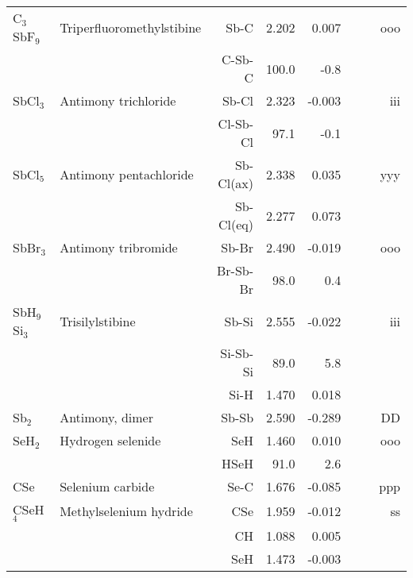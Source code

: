 \begin{table}
\begin{center}
\begin{tabular}{llrrrrrr}
 C$_3$SbF$_9$      & Triperfluoromethylstibine          &Sb-C           &     2.202   &     0.007 &  &  &   ooo \\
             &                                    &C-Sb-C       &     100.0   &      -0.8 &  &    &       \\
 SbCl$_3$       & Antimony trichloride               &Sb-Cl          &     2.323   &    -0.003 &  &  &   iii \\
             &                                    &Cl-Sb-Cl     &      97.1   &      -0.1 &  &    &       \\
 SbCl$_5$       & Antimony pentachloride             &Sb-Cl(ax)      &     2.338   &     0.035 &  &  &   yyy \\
             &                                    &Sb-Cl(eq)      &     2.277   &     0.073 &  &  &       \\
 SbBr$_3$       & Antimony tribromide                &Sb-Br          &     2.490   &    -0.019 &  &  &   ooo \\
             &                                    &Br-Sb-Br     &      98.0   &       0.4 &  &    &       \\
 SbH$_9$Si$_3$     & Trisilylstibine                    &Sb-Si          &     2.555   &    -0.022 &  &  &   iii \\
             &                                    &Si-Sb-Si     &      89.0   &       5.8 &  &    &       \\
             &                                    &Si-H           &     1.470   &     0.018 &  &  &       \\
 Sb$_2$         & Antimony, dimer                    &Sb-Sb          &     2.590   &    -0.289 &  &  &    DD \\
 SeH$_2$        & Hydrogen selenide                  &SeH            &     1.460   &     0.010 &  &  &   ooo \\
             &                                    &HSeH         &      91.0   &       2.6 &  &    &       \\
 CSe         & Selenium carbide                   &Se-C           &     1.676   &    -0.085 &  &  &   ppp \\
 CSeH$_4$       & Methylselenium hydride             &CSe            &     1.959   &    -0.012 &  &  &    ss \\
             &                                    &CH             &     1.088   &     0.005 &  &  &       \\
             &                                    &SeH            &     1.473   &    -0.003 &  &  &       \\
\hline
\end{tabular}
\end{center}
\end{table}
\clearpage

